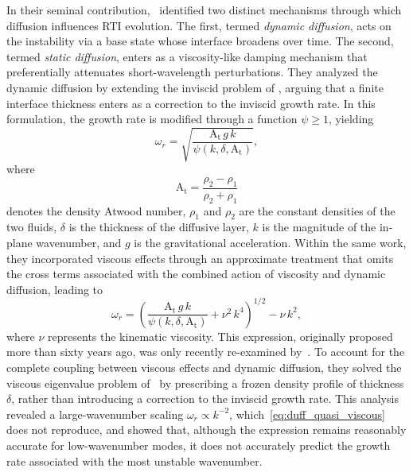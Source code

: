 \documentclass[11pt]{article}
\newcommand{\Atw}{\mathrm{A_t}}
\begin{document}
In their seminal contribution,~\citet{duff-harlow-hirt-1962} identified two distinct mechanisms through which diffusion influences RTI evolution. The first, termed \emph{dynamic diffusion}, acts on the instability via a base state whose interface broadens over time. The second, termed \emph{static diffusion}, enters as a viscosity-like damping mechanism that preferentially attenuates short-wavelength perturbations. They analyzed the dynamic diffusion by extending the inviscid problem of \citet{chandrasekhar-1961}, arguing that a finite interface thickness enters as a correction to the inviscid growth rate. In this formulation, the growth rate is modified through a function \(\psi \ge 1\), yielding
\begin{equation}
   \omega_r = \sqrt{\frac{\Atw\,g\,k}{\psi(k,\delta,\Atw)}},
\label{eq:duff_growth_rate_correction}
\end{equation}
where
\begin{equation} 
   \Atw = \frac{\rho_2 - \rho_1}{\rho_2 + \rho_1}
\end{equation}
denotes the density Atwood number, \(\rho_1\) and \(\rho_2\) are the constant densities of the two fluids, \(\delta\) is the thickness of the diffusive layer, \(k\) is the magnitude of the in-plane wavenumber, and \(g\) is the gravitational acceleration. Within the same work, they incorporated viscous effects through an approximate treatment that omits the cross terms associated with the combined action of viscosity and dynamic diffusion, leading to
\begin{equation}
   \omega_r = \left( \frac{\Atw \, g \,k}{\psi(k,\delta,\Atw)} + \nu^2\,k^{4} \right)^{1/2} - \nu\,k^{2},
\label{eq:duff_quasi_viscous}
\end{equation}
where \(\nu\) represents the kinematic viscosity. This expression, originally proposed more than sixty years ago, was only recently re-examined by~\citet{morgan-likhachev-jacobs-2016}. To account for the complete coupling between viscous effects and dynamic diffusion, they solved the viscous eigenvalue problem of~\citet{chandrasekhar-1961} by prescribing a frozen density profile of thickness \(\delta\), rather than introducing a correction to the inviscid growth rate. This analysis revealed a large-wavenumber scaling \(\omega_r \propto k^{-2}\), which~\eqref{eq:duff_quasi_viscous} does not reproduce, and showed that, although the expression remains reasonably accurate for low-wavenumber modes, it does not accurately predict the growth rate associated with the most unstable wavenumber.
\end{document}
